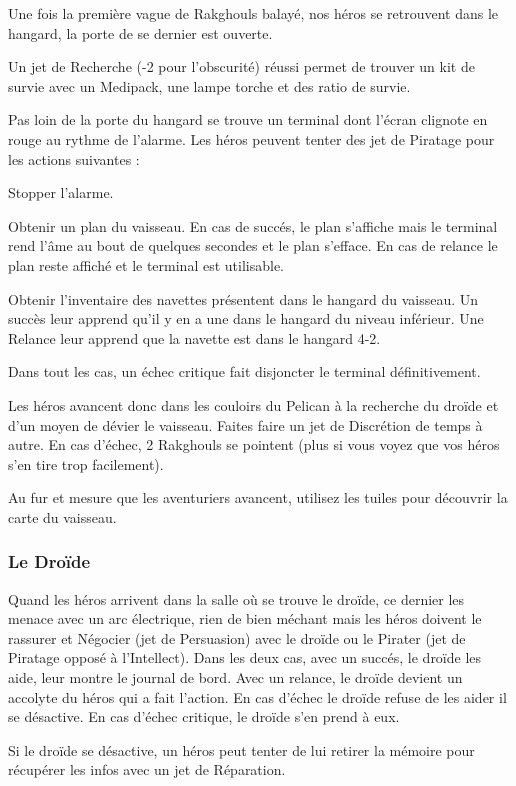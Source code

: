 Une fois la première vague de Rakghouls balayé, nos héros se retrouvent dans le hangard, la porte de se dernier est ouverte.

Un jet de Recherche (-2 pour l’obscurité) réussi permet de trouver un kit de survie avec un Medipack, une lampe torche et des ratio de survie.

Pas loin de la porte du hangard se trouve un terminal dont l’écran clignote en rouge au rythme de l’alarme. Les héros peuvent tenter des jet de Piratage pour les actions suivantes :
\begin{rebelist}
	\item Stopper l’alarme. 
	\item Obtenir un plan du vaisseau. En cas de succés, le plan s’affiche mais le terminal rend l’âme au bout de quelques secondes et le plan s’efface. En cas de relance le plan reste affiché et le terminal est utilisable.
	\item  Obtenir l’inventaire des navettes présentent dans le hangard du vaisseau. Un succès leur apprend qu’il y en a une dans le hangard du niveau inférieur. Une Relance leur apprend que la navette est dans le hangard 4-2.
\end{rebelist}
Dans tout les cas, un échec critique fait disjoncter le terminal définitivement.

Les héros avancent donc dans les couloirs du Pelican à la recherche du droïde et d’un moyen de dévier le vaisseau. Faites faire un jet de Discrétion de temps à autre. En cas d’échec, 2 Rakghouls se pointent (plus si vous voyez que vos héros s’en tire trop facilement).

Au fur et mesure que les aventuriers avancent, utilisez les tuiles pour découvrir la carte du vaisseau.

\subsubsection{Le Droïde}
Quand les héros arrivent dans la salle où se trouve le droïde, ce dernier les menace avec un arc électrique, rien de bien méchant mais les héros doivent le rassurer et Négocier (jet de Persuasion) avec le droïde ou le Pirater (jet de Piratage opposé à l’Intellect). Dans les deux cas, avec un succés, le droïde les aide, leur montre le journal de bord. Avec un relance, le droïde devient un accolyte du héros qui a fait l’action. En cas d’échec le droïde refuse de les aider il se désactive. En cas d’échec critique, le droïde s’en prend à eux.

Si le droïde se désactive, un héros peut tenter de lui retirer la mémoire pour récupérer les infos avec un jet de Réparation. 

